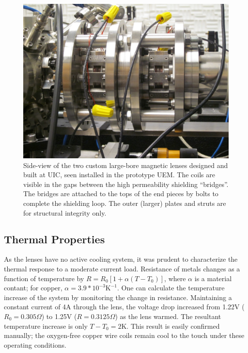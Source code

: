 \begin{figure}
  \centering
  \includegraphics{maglens.jpg}
  \caption[Side-view picture of the employed two custom large-bore magnetic lenses]{
    Side-view of the two custom large-bore magnetic lenses designed and built at UIC, seen installed in the prototype UEM.
    The coils are visible in the gaps between the high permeability shielding ``bridges''.
    The bridges are attached to the tops of the end pieces by bolts to complete the shielding loop.
    The outer (larger) plates and struts are for structural integrity only.
  }
  \label{fig:maglens-pic}
\end{figure}

\subsection{Thermal Properties} \label{sec:mag_lens_thermal}

As the lenses have no active cooling system, it was prudent to characterize the thermal response to a moderate current load.
Resistance of metals changes as a function of temperature by $ R = R_0 [ 1 + \alpha ( T - T_0 ) ] $, where $\alpha$ is a material contant; for copper, $\alpha = 3.9 * 10^{-3} \text{K}^{-1}$. 
One can calculate the temperature increase of the system by monitoring the change in resistance.
Maintaining a constant current of 4A through the lens, the voltage drop increased from 1.22V ($R_0 = 0.305\Omega$) to 1.25V ($R=0.3125\Omega$) as the lens warmed.
The resultant temperature increase is only $T - T_0 = 2\text{K}$.
This result is easily confirmed manually; the oxygen-free copper wire coils remain cool to the touch under these operating conditions.

